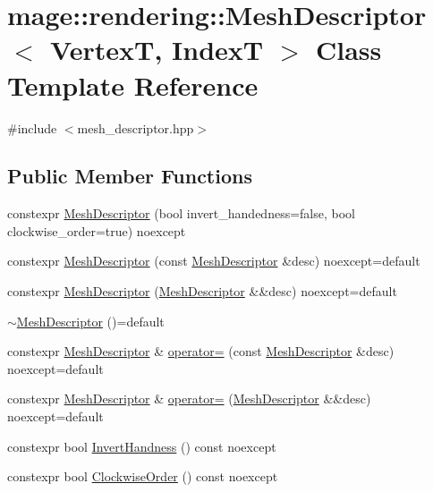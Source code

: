 \hypertarget{classmage_1_1rendering_1_1_mesh_descriptor}{}\section{mage\+:\+:rendering\+:\+:Mesh\+Descriptor$<$ VertexT, IndexT $>$ Class Template Reference}
\label{classmage_1_1rendering_1_1_mesh_descriptor}


{\ttfamily \#include $<$mesh\+\_\+descriptor.\+hpp$>$}

\subsection*{Public Member Functions}
\begin{DoxyCompactItemize}
\item 
constexpr \mbox{\hyperlink{classmage_1_1rendering_1_1_mesh_descriptor_a1b0ebe38d5591dda224370a7533f0c13}{Mesh\+Descriptor}} (bool invert\+\_\+handedness=false, bool clockwise\+\_\+order=true) noexcept
\item 
constexpr \mbox{\hyperlink{classmage_1_1rendering_1_1_mesh_descriptor_ad46be4da19cfa33f0731f371b7ebbe43}{Mesh\+Descriptor}} (const \mbox{\hyperlink{classmage_1_1rendering_1_1_mesh_descriptor}{Mesh\+Descriptor}} \&desc) noexcept=default
\item 
constexpr \mbox{\hyperlink{classmage_1_1rendering_1_1_mesh_descriptor_a929e3b4b29e421f921e5d17d0a382275}{Mesh\+Descriptor}} (\mbox{\hyperlink{classmage_1_1rendering_1_1_mesh_descriptor}{Mesh\+Descriptor}} \&\&desc) noexcept=default
\item 
\mbox{\hyperlink{classmage_1_1rendering_1_1_mesh_descriptor_a0948d279801d1b4eb7eb5dca8b0f86ea}{$\sim$\+Mesh\+Descriptor}} ()=default
\item 
constexpr \mbox{\hyperlink{classmage_1_1rendering_1_1_mesh_descriptor}{Mesh\+Descriptor}} \& \mbox{\hyperlink{classmage_1_1rendering_1_1_mesh_descriptor_a9db3890980a6e0c7ccc315067bc55853}{operator=}} (const \mbox{\hyperlink{classmage_1_1rendering_1_1_mesh_descriptor}{Mesh\+Descriptor}} \&desc) noexcept=default
\item 
constexpr \mbox{\hyperlink{classmage_1_1rendering_1_1_mesh_descriptor}{Mesh\+Descriptor}} \& \mbox{\hyperlink{classmage_1_1rendering_1_1_mesh_descriptor_a044577019dcdb37ed0d1d919d9d33887}{operator=}} (\mbox{\hyperlink{classmage_1_1rendering_1_1_mesh_descriptor}{Mesh\+Descriptor}} \&\&desc) noexcept=default
\item 
constexpr bool \mbox{\hyperlink{classmage_1_1rendering_1_1_mesh_descriptor_a0fa7557aa67c69a7978f965bdc913686}{Invert\+Handness}} () const noexcept
\item 
constexpr bool \mbox{\hyperlink{classmage_1_1rendering_1_1_mesh_descriptor_a71ea285cfb0bc3f748038de570e9084e}{Clockwise\+Order}} () const noexcept
\end{DoxyCompactItemize}
